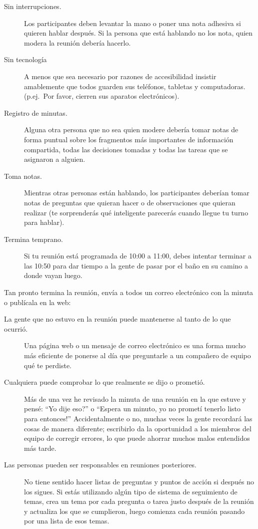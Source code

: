 \begin{description}
\item[Sin interrupciones.]
  Los participantes deben levantar la mano o poner una nota adhesiva
  si quieren hablar después.
  Si la persona que está hablando no los nota,
  quien modera la reunión debería hacerlo.

\item[Sin tecnología]
  A menos que sea necesario por razones de accesibilidad
  insistir amablemente que todos guarden sus teléfonos, tabletas y computadoras.
  (p.ej.\ Por favor, cierren sus aparatos electrónicos).

\item[Registro de minutas.]
  Alguna otra persona que no sea quien modere debería tomar notas de forma puntual sobre 
  los fragmentos más importantes de información compartida,
  todas las decisiones tomadas
  y todas las tareas que se asignaron a alguien.

\item[Toma notas.]
  Mientras otras personas están hablando,
  los participantes deberían tomar notas de preguntas que quieran hacer o de observaciones que quieran realizar
  (te sorprenderás qué inteligente parecerás cuando llegue tu turno para hablar).

\item[Termina temprano.]
  Si tu reunión está programada de 10:00 a 11:00,
  debes intentar terminar a las 10:50 para dar tiempo a la gente de pasar por el baño 
  en su camino a donde vayan luego.

\end{description}

Tan pronto termina la reunión,
envía a todos un correo electrónico con la minuta o publícala en la web:

\begin{description}

\item[La gente que no estuvo en la reunión puede mantenerse al tanto de lo que ocurrió.]
  Una página web o un mensaje de correo electrónico es una forma mucho más eficiente de ponerse al día
  que preguntarle a un compañero de equipo qué te perdiste.

\item[Cualquiera puede comprobar lo que realmente se dijo o prometió.]
  Más de una vez
  he revisado la minuta de una reunión en la que estuve
  y pensé: ``Yo dije eso?''
  o ``Espera un minuto, yo no prometí tenerlo listo para entonces!''
  Accidentalmente o no,
  muchas veces la gente recordará las cosas de manera diferente;
  escribirlo da la oportunidad a los miembros del equipo de corregir errores,
  lo que puede ahorrar muchos malos entendidos más tarde.

\item[Las personas pueden ser responsables en reuniones posteriores.]
  No tiene sentido hacer listas de preguntas y puntos de acción
  si después no los sigues.
  Si estás utilizando algún tipo de sistema de seguimiento de temas,
  crea un tema por cada pregunta o tarea justo después de la reunión
  y actualiza los que se cumplieron,
  luego comienza cada reunión pasando por una lista de esos temas.

\end{description}

